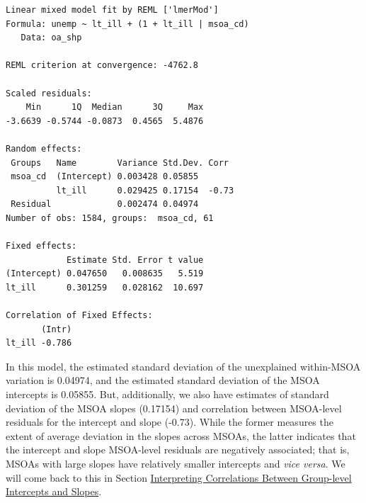 \documentclass[
  letterpaper,
  DIV=11,
  numbers=noendperiod,
  oneside]{scrreprt}
\newenvironment{Shaded}{\begin{snugshade}}{\end{snugshade}}
\newcommand{\AttributeTok}[1]{\textcolor[rgb]{0.40,0.45,0.13}{#1}}
\newcommand{\CommentTok}[1]{\textcolor[rgb]{0.37,0.37,0.37}{#1}}
\newcommand{\DecValTok}[1]{\textcolor[rgb]{0.68,0.00,0.00}{#1}}
\newcommand{\FunctionTok}[1]{\textcolor[rgb]{0.28,0.35,0.67}{#1}}
\newcommand{\NormalTok}[1]{\textcolor[rgb]{0.00,0.23,0.31}{#1}}
\newcommand{\OtherTok}[1]{\textcolor[rgb]{0.00,0.23,0.31}{#1}}
\newcommand{\SpecialCharTok}[1]{\textcolor[rgb]{0.37,0.37,0.37}{#1}}
\begin{document}
\begin{Shaded}
\end{Shaded}

\begin{verbatim}
Linear mixed model fit by REML ['lmerMod']
Formula: unemp ~ lt_ill + (1 + lt_ill | msoa_cd)
   Data: oa_shp

REML criterion at convergence: -4762.8

Scaled residuals: 
    Min      1Q  Median      3Q     Max 
-3.6639 -0.5744 -0.0873  0.4565  5.4876 

Random effects:
 Groups   Name        Variance Std.Dev. Corr 
 msoa_cd  (Intercept) 0.003428 0.05855       
          lt_ill      0.029425 0.17154  -0.73
 Residual             0.002474 0.04974       
Number of obs: 1584, groups:  msoa_cd, 61

Fixed effects:
            Estimate Std. Error t value
(Intercept) 0.047650   0.008635   5.519
lt_ill      0.301259   0.028162  10.697

Correlation of Fixed Effects:
       (Intr)
lt_ill -0.786
\end{verbatim}

In this model, the estimated standard deviation of the unexplained
within-MSOA variation is 0.04974, and the estimated standard deviation
of the MSOA intercepts is 0.05855. But, additionally, we also have
estimates of standard deviation of the MSOA slopes (0.17154) and
correlation between MSOA-level residuals for the intercept and slope
(-0.73). While the former measures the extent of average deviation in
the slopes across MSOAs, the latter indicates that the intercept and
slope MSOA-level residuals are negatively associated; that is, MSOAs
with large slopes have relatively smaller intercepts and \emph{vice
versa}. We will come back to this in Section
\hyperref[interpreting-correlations-between-group-level-intercepts-and-slopes]{Interpreting
Correlations Between Group-level Intercepts and Slopes}.
\end{document}
